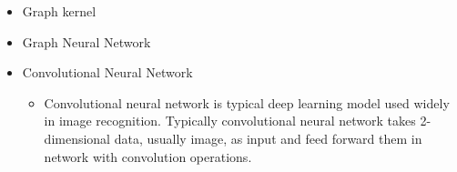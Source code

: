 \begin{itemize}
\item
Graph kernel

\item
Graph Neural Network

\item
Convolutional Neural Network

\begin{itemize}

\item
Convolutional neural network is typical deep learning model used widely in image recognition. Typically convolutional neural network takes 2-dimensional data, usually image, as input and feed forward them in network with convolution operations.
\end{itemize}

\end{itemize}